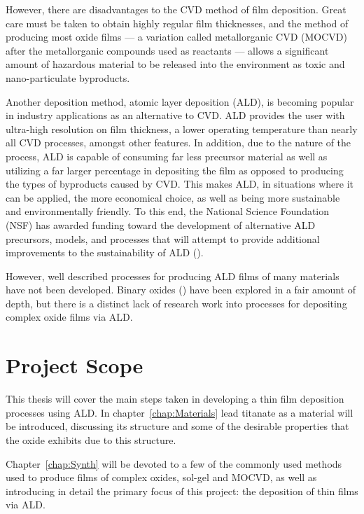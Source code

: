 However, there are disadvantages to the CVD method of film deposition. Great care must be taken to obtain highly regular film thicknesses, and the method of producing most oxide films --- a variation called metallorganic CVD (MOCVD) after the metallorganic compounds used as reactants --- allows a significant amount of hazardous material to be released into the environment as toxic and nano-particulate byproducts. 

Another deposition method, atomic layer deposition (ALD), is becoming popular in industry applications as an alternative to CVD. ALD provides the user with ultra-high resolution on film thickness, a lower operating temperature than nearly all CVD processes, amongst other features. In addition, due to the nature of the process, ALD is capable of consuming far less precursor material as well as utilizing a far larger percentage in depositing the film as opposed to producing the types of byproducts caused by CVD. This makes ALD, in situations where it can be applied, the more economical choice, as well as being more sustainable and environmentally friendly. To this end, the National Science Foundation (NSF) has awarded funding toward the development of alternative ALD precursors, models, and processes that will attempt to provide additional improvements to the sustainability of ALD ().

However, well described processes for producing ALD films of many materials have not been developed. Binary oxides () have been explored in a fair amount of depth, but there is a distinct lack of research work into processes for depositing complex oxide films via ALD. 


\section{Project Scope}
\label{sec:Intro-Scope}

This thesis will cover the main steps taken in developing a thin film deposition processes using ALD. In chapter~\ref{chap:Materials} lead titanate as a material will be introduced, discussing its structure and some of the desirable properties that the oxide exhibits due to this structure. 

Chapter~\ref{chap:Synth} will be devoted to a few of the commonly used methods used to produce films of complex oxides, sol-gel and MOCVD, as well as introducing in detail the primary focus of this project: the deposition of thin films via ALD. 

